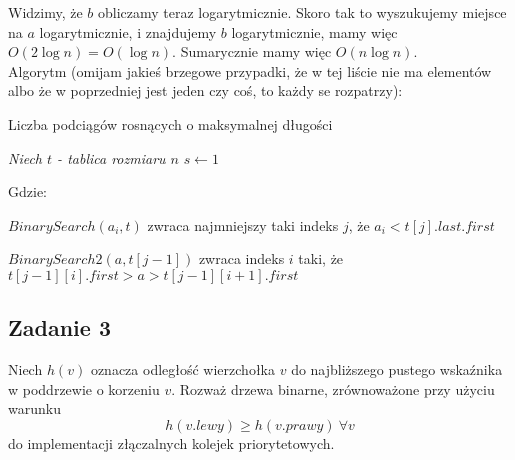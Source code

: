 \documentclass[a4paper]{article}
\begin{document}
Widzimy, że $b$ obliczamy teraz logarytmicznie. Skoro tak to wyszukujemy miejsce na $a$ logarytmicznie, i znajdujemy $b$ logarytmicznie, mamy więc $O(2\log{n})=O(\log{n})$. Sumarycznie mamy więc $O(n\log{n})$.\\ Algorytm (omijam jakieś brzegowe przypadki, że w tej liście nie ma elementów albo że w poprzedniej jest jeden czy coś, to każdy se rozpatrzy):\\
\begin{algorithm}[H]
\caption{Liczba podciągów rosnących o maksymalnej długości}
\BlankLine
\emph{Niech $t$ - tablica rozmiaru $n$}\;
\emph{$s\leftarrow 1$}\;

\end{algorithm}

Gdzie:

$BinarySearch(a_i,t)$ zwraca najmniejszy taki indeks $j$, że $a_i<t[j].last.first$

$BinarySearch2(a,t[j-1])$ zwraca indeks $i$ taki, że $t[j-1][i].first>a>t[j-1][i+1].first$

\subsection*{Zadanie 3}
Niech $h(v)$ oznacza odległość wierzchołka $v$ do najbliższego pustego wskaźnika w poddrzewie o korzeniu $v$. Rozważ drzewa binarne, zrównoważone przy użyciu warunku $$h(v.lewy)\geq h(v.prawy)\ \forall v $$ do implementacji złączalnych kolejek priorytetowych.
\end{document}
